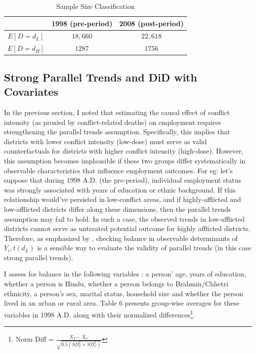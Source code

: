 \documentclass[12pt,a4paper]{article}
\providecommand{\tabularnewline}{\\}
\begin{document}
	\begin{table}[H]
		\caption{Sample Size Classification}
		
		\renewcommand{\arraystretch}{1.2}
		\vspace{1em}
		\centering{}%
		\begin{tabular}{c|c|c}
			& 1998 (pre-period) & 2008 (post-period)\tabularnewline
			\hline 
			$E[D = d_{L}]$ & $18,660$ & $22,618$\tabularnewline
			$E[D = d_{H}]$ & $1287$ & $1756$\tabularnewline
			\hline 
		\end{tabular}
	\end{table}
	
	
	

\subsection{Strong Parallel Trends and DiD with Covariates}
In the previous section, I noted that estimating the causal effect of conflict intensity (as proxied by conflict-related deaths) on employment requires strengthening the parallel trends assumption. Specifically, this implies that districts with lower conflict intensity (low-dose) must serve as valid counterfactuals for districts with higher conflict intensity (high-dose). However, this assumption becomes implausible if these two groups differ systematically in observable characteristics that influence employment outcomes. For eg: let's suppose that during 1998 A.D. (the pre-period), individual employment status was strongly associated with years of education or ethnic background. If this relationship would've persisted in low-conflict areas, and if highly-afflicted and low-afflicted districts differ along these dimensions, then the parallel trends assumption may fail to hold. In such a case, the observed trends in low-afflicted districts cannot serve as untreated potential outcome for highly afflicted districts. Therefore, as emphasized by \parencite{baker2025difference}, checking balance in observable determinants of $Y_i,t(d_L)$ is a sensible way to evaluate the validity of parallel trends (in this case strong parallel trends).

I assess for balance in the following variables : a person' age, years of education, whether a person is Hindu, whether a person belongs to Brahmin/Chhetri ethnicity, a person's sex, marital status, household size and whether the person lived in an urban or rural area. Table 6 presents group-wise averages for these variables in 1998 A.D. along with their normalized differences\footnote{Norm Diff = $\frac{{\bar{X}_{T}-\bar{X}_{C}}}{\sqrt{0.5(SD_{T}^{2}+SD_{C}^{2})}}$}.
\end{document}
